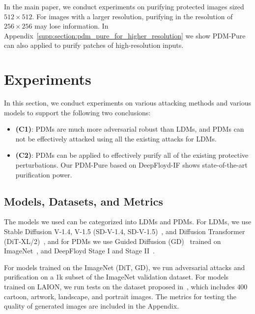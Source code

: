 \documentclass{article}
\begin{document}
In the main paper, we conduct experiments on purifying protected images sized $512\times 512$. For images with a larger resolution, purifying in the resolution of $256\times 256$ may lose information. In Appendix~\ref{supp:section:pdm_pure_for_higher_resolution} we show PDM-Pure can also applied to purify patches of high-resolution inputs.








\section{Experiments}

In this section, we conduct experiments on various attacking methods and various models to support the following two conclusions:

\begin{itemize}[parsep=0pt,topsep=0pt,leftmargin=12pt]
    \item \textbf{(C1)}: PDMs are much more adversarial robust than LDMs, and PDMs can not be effectively attacked using all the existing attacks for LDMs.
    \item \textbf{(C2)}: PDMs can be applied to effectively purify all of the existing protective perturbations. Our PDM-Pure based on DeepFloyd-IF shows state-of-the-art purification power.
\end{itemize}

\subsection{Models, Datasets, and Metrics} 
The models we used can be categorized into LDMs and PDMs. For LDMs, we use Stable Diffusion V-1.4, V-1.5 (SD-V-1.4, SD-V-1.5)~\cite{ldm}, and Diffusion Transformer (DiT-XL/2)~\cite{dit}, and for PDMs we use Guided Diffusion (GD)~\cite{guideddiffusion} trained on ImageNet~\cite{deng2009imagenet}, and DeepFloyd Stage I and Stage II~\cite{deepfloyd}. 

For models trained on the ImageNet (DiT, GD), we run adversarial attacks and purification on a 1k subset of the ImageNet validation dataset. For models trained on LAION, we run tests on the dataset proposed in~\cite{sdsattack}, which includes $400$ cartoon, artwork, landscape, and portrait images. The metrics for testing the quality of generated images are included in the Appendix.
\end{document}

